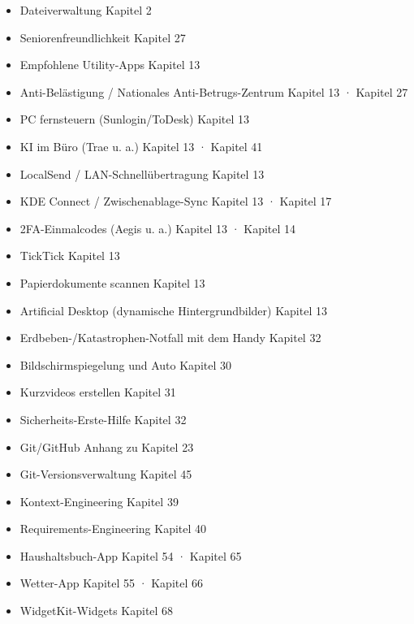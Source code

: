\begin{itemize}
  \item Dateiverwaltung Kapitel 2
  \item Seniorenfreundlichkeit Kapitel 27
  \item Empfohlene Utility-Apps Kapitel 13
  \item Anti-Belästigung / Nationales Anti-Betrugs-Zentrum Kapitel 13 · Kapitel 27
  \item PC fernsteuern (Sunlogin/ToDesk) Kapitel 13
  \item KI im Büro (Trae u. a.) Kapitel 13 · Kapitel 41
  \item LocalSend / LAN-Schnellübertragung Kapitel 13
  \item KDE Connect / Zwischenablage-Sync Kapitel 13 · Kapitel 17
  \item 2FA-Einmalcodes (Aegis u. a.) Kapitel 13 · Kapitel 14
  \item TickTick Kapitel 13
  \item Papierdokumente scannen Kapitel 13
  \item Artificial Desktop (dynamische Hintergrundbilder) Kapitel 13
  \item Erdbeben-/Katastrophen-Notfall mit dem Handy Kapitel 32
  \item Bildschirmspiegelung und Auto Kapitel 30
  \item Kurzvideos erstellen Kapitel 31
  \item Sicherheits-Erste-Hilfe Kapitel 32
  \item Git/GitHub Anhang zu Kapitel 23
  \item Git-Versionsverwaltung Kapitel 45
  \item Kontext-Engineering Kapitel 39
  \item Requirements-Engineering Kapitel 40
  \item Haushaltsbuch-App Kapitel 54 · Kapitel 65
  \item Wetter-App Kapitel 55 · Kapitel 66
  \item WidgetKit-Widgets Kapitel 68
\end{itemize}
